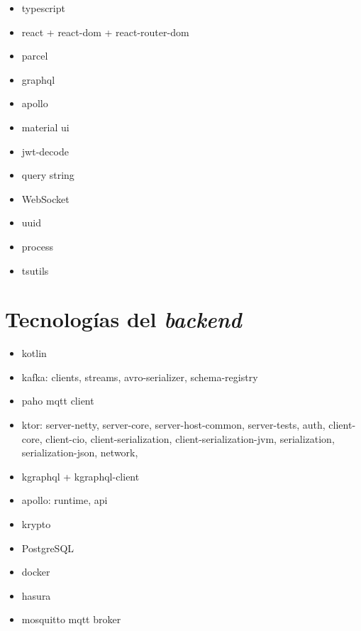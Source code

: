 \begin{itemize}

  \item typescript 
  
  \item react + react-dom + react-router-dom

  \item parcel 

  \item graphql
  
  \item apollo

  \item material ui


  \item jwt-decode

  \item query string

  \item WebSocket

  \item uuid
  
  \item process 

  \item tsutils

\end{itemize}



\section{Tecnologías del \textit{backend}}

\begin{itemize}


  \item kotlin

  \item kafka: clients, streams, avro-serializer, schema-registry

  \item paho mqtt client

  \item ktor: server-netty, server-core, server-host-common, server-tests, auth, client-core, client-cio, client-serialization, client-serialization-jvm, serialization, serialization-json, network, 


  \item kgraphql + kgraphql-client

  \item apollo: runtime, api

  \item krypto

  \item PostgreSQL

  \item docker

  \item hasura

  \item mosquitto mqtt broker


\end{itemize}


